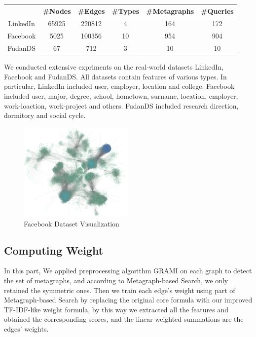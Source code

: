 \documentclass[a4paper, 12pt]{article} %
\begin{document}
    \begin{center}
        \begin{tabular}{c|ccccc}
        \hline & \#Nodes & \#Edges & \#Types & \#Metagraphs & \#Queries \\
        \hline
        LinkedIn & 65925 & 220812 & 4 & 164 & 172 \\
        Facebook & 5025 & 100356 & 10 & 954 & 904 \\
        FudanDS & 67 & 712 & 3 & 10 & 10 \\
        \hline
        \end{tabular}
    \end{center}

    We conducted extensive expriments on the real-world datasets LinkedIn, Facebook and FudanDS. All datasets contain features of various types. In particular, LinkedIn included user, employer, location and college. Facebook included user, major, degree, school, hometown, surname, location, employer, work-loaction, work-project and others. FudanDS included research direction, dormitory and social cycle.
    
    \begin{figure}[H]
        \centering
        \includegraphics[width=0.5\textwidth]{img/facebook.png}
        \caption{Facebook Dataset Visualization}
    \end{figure}
    
    \subsection{\textbf{Computing Weight}}
    
    In this part, We applied preprocessing algorithm GRAMI on each graph to detect the set of metagraphs, and according to Metagraph-based Search, we only retained the symmetric ones. Then we train each edge's weight using part of Metagraph-based Search by replacing the original core formula with our improved TF-IDF-like weight formula, by this way we extracted all the features and obtained the corresponding scores, and the linear weighted summations are the edges' weights.
    
\end{document}
